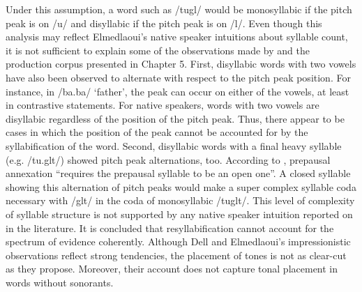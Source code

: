 Under this assumption, a word such as /tugl/ would be monosyllabic if the pitch peak is on /u/ and disyllabic if  the pitch peak is on /l/. Even though this analysis may reflect Elmedlaoui’s native speaker intuitions about syllable count, it is not sufficient to explain some of the observations made by \citet{Grice.etal2015tash} and the production corpus presented in Chapter 5. First, disyllabic words with two vowels have also been observed to alternate with respect to the pitch peak position. For instance, in /ba.ba/ ‘father’, the peak can occur on either of the vowels, at least in contrastive statements. For native speakers, words with two vowels are disyllabic regardless of the position of the pitch peak. Thus, there appear to be cases in which the position of the peak cannot be accounted for by the syllabification of the word. Second, disyllabic words with a final heavy syllable (e.g. /tu.glt/) showed pitch peak alternations, too. According to \citet[120]{DE1985}, prepausal annexation “requires the prepausal syllable to be an open one”. A closed syllable showing this alternation of pitch peaks would make a super complex syllable coda necessary with /glt/ in the coda of monosyllabic /tuglt/. This level of complexity of syllable structure is not supported by any native speaker intuition reported on in the literature. It is concluded that resyllabification cannot account for the spectrum of evidence coherently. Although Dell and Elmedlaoui’s impressionistic observations reflect strong tendencies, the placement of tones is not as clear-cut as they propose. Moreover, their account does not capture tonal placement in words without sonorants.  


